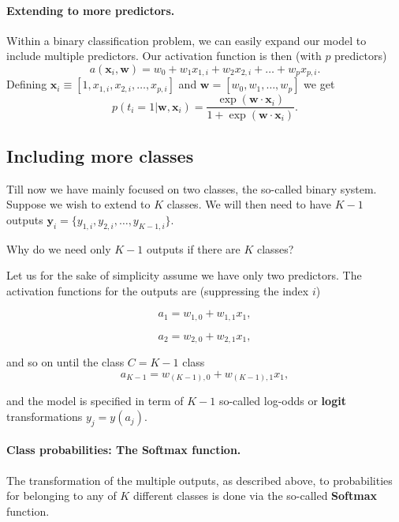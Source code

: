 \documentclass[%
oneside,                 %
final,                   %
10pt]{article}
\newenvironment{question_mdfboxadmon}[1][]{
\begin{question_mdfboxmdframed}[frametitle=#1]
}
{
\end{question_mdfboxmdframed}
}
\begin{document}
\paragraph{Extending to more predictors.}
Within a binary classification problem, we can easily expand our model to include multiple predictors. Our activation function is then (with $p$ predictors)
\[
a( \boldsymbol{x}_i, \boldsymbol{w} ) = w_0 + w_1 x_{1,i} + w_2 x_{2,i} + \dots + w_p x_{p,i}.
\]
Defining $\boldsymbol{x}_i \equiv [1,x_{1,i}, x_{2,i}, \dots, x_{p,i}]$ and $\boldsymbol{w}=[w_0, w_1, \dots, w_p]$ we get
\[
p(t_i=1 | \boldsymbol{w}, \boldsymbol{x}_i) = \frac{ \exp{ \left( \boldsymbol{w} \cdot \boldsymbol{x}_i \right) }}{ 1 + \exp{ \left( \boldsymbol{w} \cdot \boldsymbol{x}_i \right) } }.
\]

\subsection{Including more classes}

Till now we have mainly focused on two classes, the so-called binary
system. Suppose we wish to extend to $K$ classes.  We will then need to have $K-1$ outputs $\boldsymbol{y}_i = \{ y_{1,i}, y_{2,i}, \ldots, y_{K-1,i} \}$. 


\begin{question_mdfboxadmon}[Question]
Why do we need only $K-1$ outputs if there are $K$ classes?
\end{question_mdfboxadmon} %



Let us for the sake of simplicity assume we have only two predictors. The activation functions for the outputs are (suppressing the index $i$)

\[
a_1 = w_{1,0}+w_{1,1}x_1,
\]

\[
a_2 = w_{2,0}+w_{2,1}x_1,
\]

and so on until the class $C=K-1$ class
\[
a_{K-1} = w_{(K-1),0}+w_{(K-1),1}x_1,
\]

and the model is specified in term of $K-1$ so-called log-odds or \textbf{logit} transformations $y_j = y(a_j)$.


\paragraph{Class probabilities: The Softmax function.}
The transformation of the multiple outputs, as described above, to probabilities for belonging to any of $K$ different classes is done via the so-called \textbf{Softmax} function.
\end{document}
